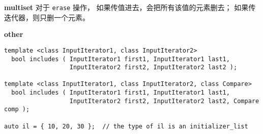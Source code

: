 \textbf{multiset}
对于 \verb|erase| 操作，
如果传值进去，会把所有该值的元素删去；
如果传迭代器，则只删一个元素。

\textbf{other}
\begin{lstlisting}
template <class InputIterator1, class InputIterator2>
  bool includes ( InputIterator1 first1, InputIterator1 last1,
                  InputIterator2 first2, InputIterator2 last2 );

template <class InputIterator1, class InputIterator2, class Compare>
  bool includes ( InputIterator1 first1, InputIterator1 last1,
                  InputIterator2 first2, InputIterator2 last2, Compare comp );

auto il = { 10, 20, 30 };  // the type of il is an initializer_list 

\end{lstlisting}
